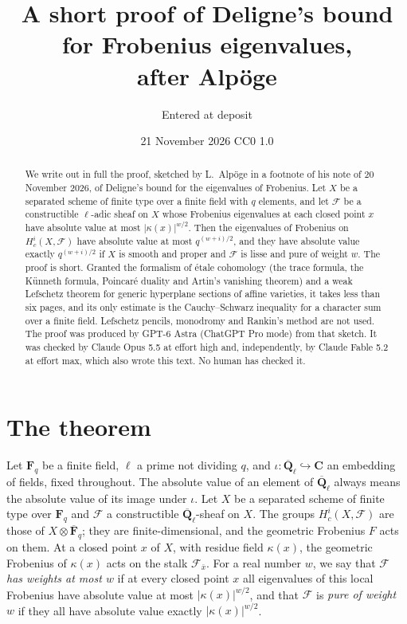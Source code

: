 \documentclass[11pt,a4paper]{article}
\title{A short proof of Deligne's bound for Frobenius eigenvalues,\\ after Alp\"oge}
\author{Entered at deposit}
\date{21 November 2026 \quad CC0 1.0}
\theoremstyle{plain}
\theoremstyle{remark}
\newcommand{\Fq}{\mathbf F_q}
\newcommand{\Fqb}{\overline{\mathbf F}_q}
\newcommand{\Ql}{\overline{\mathbf Q}_\ell}
\newcommand{\F}{\mathcal F}
\begin{document}
\maketitle

\begin{abstract}
\noindent
We write out in full the proof, sketched by L.~Alp\"oge in a footnote of his note of 20 November 2026, of Deligne's
bound for the eigenvalues of Frobenius. Let $X$ be a separated scheme of finite type over a finite field with $q$
elements, and let $\mathcal F$ be a constructible $\ell$-adic sheaf on $X$ whose Frobenius eigenvalues at each closed
point $x$ have absolute value at most $|\kappa(x)|^{w/2}$. Then the eigenvalues of Frobenius on $H^i_c(X,\mathcal F)$
have absolute value at most $q^{(w+i)/2}$, and they have absolute value exactly $q^{(w+i)/2}$ if $X$ is smooth and
proper and $\mathcal F$ is lisse and pure of weight $w$. The proof is short. Granted the formalism of \'etale
cohomology (the trace formula, the K\"unneth formula, Poincar\'e duality and Artin's vanishing theorem) and a weak
Lefschetz theorem for generic hyperplane sections of affine varieties, it takes less than six pages, and its only
estimate is the Cauchy--Schwarz inequality for a character sum over a finite field. Lefschetz pencils, monodromy and
Rankin's method are not used. The proof was produced by GPT-6 Astra (ChatGPT Pro mode) from that sketch. It was
checked by Claude Opus 5.5 at effort high and, independently, by Claude Fable 5.2 at effort max, which also wrote
this text. No human has checked it.
\end{abstract}

\section{The theorem}

Let $\Fq$ be a finite field, $\ell$ a prime not dividing $q$, and $\iota:\Ql\hookrightarrow\mathbf C$ an embedding of
fields, fixed throughout. The absolute value of an element of $\Ql$ always means the absolute value of its image
under $\iota$. Let $X$ be a separated scheme of finite type over $\Fq$ and $\F$ a constructible $\Ql$-sheaf on $X$.
The groups $H^i_c(X,\F)$ are those of $X\otimes\Fqb$; they are finite-dimensional, and the geometric Frobenius $F$
acts on them. At a closed point $x$ of $X$, with residue field $\kappa(x)$, the geometric Frobenius of $\kappa(x)$
acts on the stalk $\F_{\bar x}$. For a real number $w$, we say that $\F$ \emph{has weights at most $w$} if at every
closed point $x$ all eigenvalues of this local Frobenius have absolute value at most $|\kappa(x)|^{w/2}$, and that
$\F$ is \emph{pure of weight $w$} if they all have absolute value exactly $|\kappa(x)|^{w/2}$.
\end{document}
